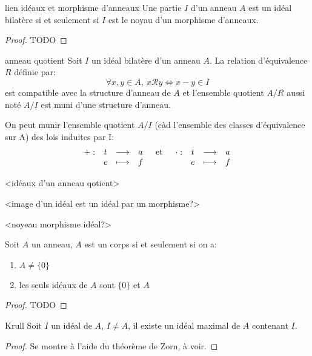 \begin{theorem}{lien idéaux et morphisme d'anneaux}{}
    Une partie $I$ d'un anneau $A$ est un idéal bilatère si et seulement si $I$
    est le noyau d'un morphisme d'anneaux.
\end{theorem}

\begin{proof}
    TODO
\end{proof}

\begin{proposition}{anneau quotient}{}
    Soit $I$ un idéal bilatère d'un anneau $A$. La relation d'équivalence $R$ définie par:
    \[ \forall x, y \in A, ~ x \mathscr{R} y \Longleftrightarrow x - y \in I \]
    est compatible avec la structure d'anneau de $A$ et l'ensemble quotient $A/R$
    aussi noté $A/I$ est muni d'une structure d'anneau.
    \newline

    On peut munir l'ensemble quotient $A/I$ (càd l'ensemble des classes d'équivalence sur A) des lois induites par I:
    \[ \begin{array}{lcr}
        \begin{array}[t]{cccc}+ : & t & \longrightarrow & a \\ & e & \longmapsto & f\end{array} & \text{et} & \begin{array}[t]{cccc}\cdot : & t & \longrightarrow & a \\ & e & \longmapsto & f\end{array}
    \end{array} \]
\end{proposition}

<idéaux d'un anneau qotient>

<image d'un idéal est un idéal par un morphisme?>

<noyeau morphisme idéal?>

\begin{lemma}{}{}
    Soit $A$ un anneau, $A$ est un corps si et seulement si on a:
    \begin{enumerate}[(1)]
        \item $A \neq \{0\}$
        \item les seuls idéaux de $A$ sont $\{0\}$ et $A$
    \end{enumerate}
\end{lemma}

\begin{proof}
    TODO
\end{proof}

\begin{theorem}{Krull}{}
    Soit $I$ un idéal de $A$, $I \neq A$, il existe un idéal maximal de $A$ contenant $I$.
\end{theorem}

\begin{proof}
    Se montre à l'aide du théorème de Zorn, à voir.
\end{proof}

